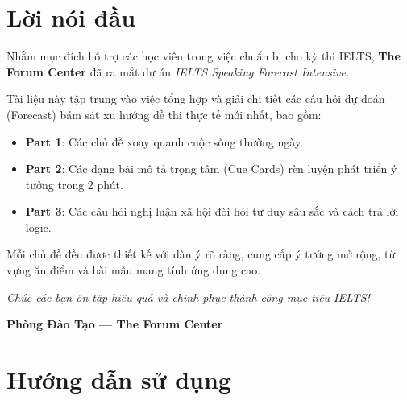 
\frontmatter

\tableofcontents
\clearpage

\chapter*{Lời nói đầu}

Nhằm mục đích hỗ trợ các học viên trong việc chuẩn bị cho kỳ thi IELTS, \textbf{The Forum Center} đã ra mắt dự án \textit{IELTS Speaking Forecast Intensive}.

Tài liệu này tập trung vào việc tổng hợp và giải chi tiết các câu hỏi dự đoán (Forecast) bám sát xu hướng đề thi thực tế mới nhất, bao gồm:
\begin{itemize}[leftmargin=2em, itemsep=4pt]
  \item \textbf{Part 1}: Các chủ đề xoay quanh cuộc sống thường ngày.
  \item \textbf{Part 2}: Các dạng bài mô tả trọng tâm (Cue Cards) rèn luyện phát triển ý tưởng trong 2 phút.
  \item \textbf{Part 3}: Các câu hỏi nghị luận xã hội đòi hỏi tư duy sâu sắc và cách trả lời logic.
\end{itemize}

Mỗi chủ đề đều được thiết kế với dàn ý rõ ràng, cung cấp ý tưởng mở rộng, từ vựng ăn điểm và bài mẫu mang tính ứng dụng cao.

\vspace{10pt}
\begin{center}
  \textit{\color{ForumDarkBlue}Chúc các bạn ôn tập hiệu quả và chinh phục thành công mục tiêu IELTS!}
\end{center}

\vfill
\begin{flushright}
  \textbf{Phòng Đào Tạo — The Forum Center}
\end{flushright}

\clearpage

\chapter*{Hướng dẫn sử dụng}

